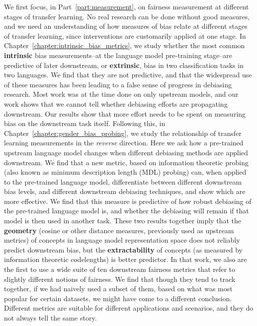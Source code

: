 We first focus, in Part~\ref{part:measurement}, on fairness measurement at different stages of transfer learning. No real research can be done without good measures, and we need an understanding of how measures of bias relate at different stages of transfer learning, since interventions are customarily applied at one stage. In Chapter~\ref{chapter:intrinsic_bias_metrics}, we study whether the most common \textbf{intrinsic} bias measurements--at the language model pre-training stage--are predictive of later downstream, or \textbf{extrinsic}, bias in two classification tasks in two languages. We find that they are not predictive, and that the widespread use of these measures has been leading to a false sense of progress in debiasing research. Most work was at the time done on only upstream models, and our work shows that we cannot tell whether debiasing efforts are propagating downstream. Our results show that more effort needs to be spent on measuring bias on the downstream task itself. Following this, in Chapter~\ref{chapter:gender_bias_probing}, we study the relationship of transfer learning measurements in the \textit{reverse} direction. Here we ask how a pre-trained upstream language model changes when different debiasing methods are applied downstream. We find that a new metric, based on information theoretic probing (also known as minimum description length (MDL) probing) \citep{voita-titov-2020-information} can, when applied to the pre-trained language model, differentiate between different downstream bias levels, and different downstream debiasing techniques, and show which are more effective. We find that this measure is predictive of how robust debiasing of the pre-trained language model is, and whether the debiasing will remain if that model is then used in another task. These two results together imply that the \textbf{geometry} (cosine or other distance measures, previously used as upstream metrics) of concepts in language model representation space does not reliably predict downstream bias, but the \textbf{extractability} of concepts (as measured by information theoretic codelengths) is better predictor. In that work, we also are the first to use a wide suite of ten downstream fairness metrics that refer to slightly different notions of fairness. We find that though they tend to track together, if we had naively used a subset of them, based on what was most popular for certain datasets, we might have come to a different conclusion. Different metrics are suitable for different applications and scenarios, and they do not always tell the same story. 

